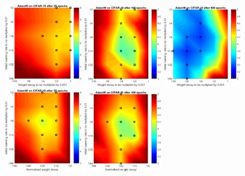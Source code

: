\documentclass[usenames,dvipsnames]{article} %
\begin{document}
\begin{figure}[p]%
\begin{center}
	\includegraphics[width=0.3\textwidth]{sfig2_ADAMW_25nonorm.pdf} 
  \includegraphics[width=0.3\textwidth]{sfig2_ADAMW_100nonorm.pdf} 
	\includegraphics[width=0.3\textwidth]{sfig2_ADAMW_400nonorm.pdf}\\
	\includegraphics[width=0.3\textwidth]{sfig2_ADAMW_25.pdf} 
  \includegraphics[width=0.3\textwidth]{sfig2_ADAMW_100.pdf}

\end{center}
\end{figure}
\end{document}
